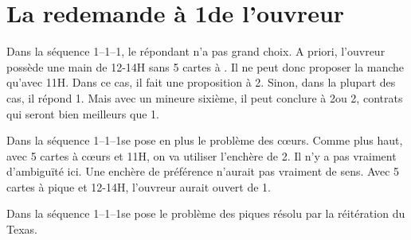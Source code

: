 \documentclass[a4paper,12pt, french]{article}
\newcommand{\T}{\Cl}
\newcommand{\K}{\Di}
\newcommand{\C}{\He}
\renewcommand{\P}{\Sp}
\begin{document}
\section{La redemande à 1\P de l'ouvreur}

Dans la séquence 1\T--1\K--1\P, le répondant n'a pas grand choix. A priori, l'ouvreur possède une main de 12-14H sans 5 cartes à \C. Il ne peut donc proposer la manche qu'avec 11H. 
Dans ce cas, il fait une proposition à  2\NT. Sinon, dans la plupart des cas, il répond 1\NT. Mais avec un mineure sixième, il peut conclure à 2\T ou 2\K, contrats qui seront bien meilleurs que 1\NT. 

Dans la séquence 1\K--1\C--1\P se pose en plus le problème des cœurs. Comme plus haut, avec 5 cartes à cœurs et 11H, on va utiliser l'enchère de 2\P. Il n'y a pas vraiment d'ambiguïté ici. Une enchère de préférence n'aurait pas vraiment de sens. Avec 5 cartes à pique et 12-14H, l'ouvreur aurait ouvert de 1\NT.

Dans la séquence 1\T--1\C--1\P se pose le problème des piques résolu par la réitération du Texas.
\end{document}
